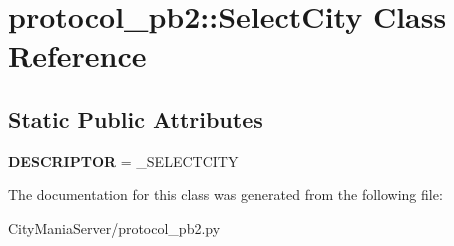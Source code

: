 \hypertarget{classprotocol__pb2_1_1SelectCity}{
\section{protocol\_\-pb2::SelectCity Class Reference}
\label{classprotocol__pb2_1_1SelectCity}
}
\subsection*{Static Public Attributes}
\begin{DoxyCompactItemize}
\item 
\hypertarget{classprotocol__pb2_1_1SelectCity_aa29e78e39d99202f08ba209646ec045f}{
{\bfseries DESCRIPTOR} = \_\-SELECTCITY}
\label{classprotocol__pb2_1_1SelectCity_aa29e78e39d99202f08ba209646ec045f}

\end{DoxyCompactItemize}


The documentation for this class was generated from the following file:\begin{DoxyCompactItemize}
\item 
CityManiaServer/protocol\_\-pb2.py\end{DoxyCompactItemize}
